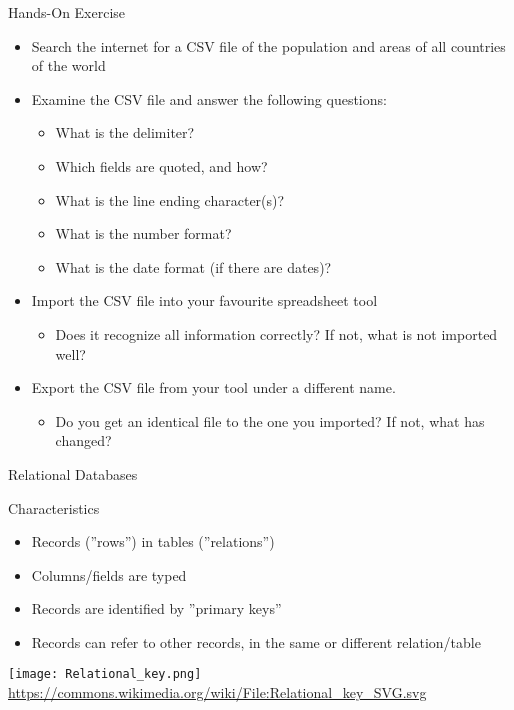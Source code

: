 \documentclass[ignorenonframetext,xcolor=x11names]{beamer}
\begin{document}
\begin{frame}{Hands-On Exercise}
\begin{itemize}
	\item Search the internet for a CSV file of the population and areas of all countries of the world
	\item Examine the CSV file and answer the following questions:
	\begin{itemize}
		\item What is the delimiter?
		\item Which fields are quoted, and how?
		\item What is the line ending character(s)?
		\item What is the number format?
		\item What is the date format (if there are dates)?
	\end{itemize}
	\item Import the CSV file into your favourite spreadsheet tool
	\begin{itemize}
		\item Does it recognize all information correctly? If not, what is not imported well?
	\end{itemize}
	\item Export the CSV file from your tool under a different name.
	\begin{itemize}
		\item Do you get an identical file to the one you imported? If not, what has changed?
	\end{itemize}
\end{itemize}
\end{frame}

\begin{frame}{Relational Databases}
\begin{block}{Characteristics}
\begin{itemize}
	\item Records (''rows'') in tables (''relations'')
	\item Columns/fields are typed
	\item Records are identified by ''primary keys''
	\item Records can refer to other records, in the same or different relation/table
\end{itemize}
\end{block}
\centering
\texttt{[image: Relational\_key.png]}
\tiny{\url{https://commons.wikimedia.org/wiki/File:Relational_key_SVG.svg}}
\end{frame}
\end{document}
